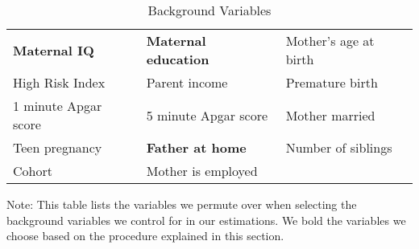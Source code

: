 \begin{table}[H]
\centering
\begin{threeparttable}
\caption{Background Variables}
\label{tab:pselectvars}
\begin{tabular}{C{5cm} C{5cm} C{5cm}}
\toprule
\textbf{Maternal IQ}			& \textbf{Maternal education}		& Mother's age at birth \\
High Risk Index		& Parent income			& Premature birth \\
1 minute Apgar score	& 5 minute Apgar score	& Mother married \\
Teen pregnancy		& \textbf{Father at home}			& Number of siblings \\
Cohort 				& Mother is employed		& \\
\bottomrule
\end{tabular}
\begin{tablenotes}
\footnotesize
\item Note: This table lists the variables we permute over when selecting the background variables we control for in our estimations. We bold the variables we choose based on the procedure explained in this section.
\end{tablenotes}
\end{threeparttable}
\end{table}